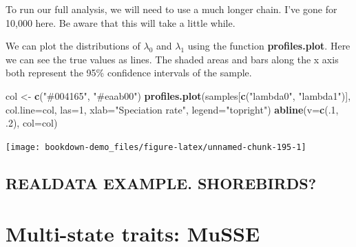 \documentclass[
]{book}
\newenvironment{Shaded}{\begin{snugshade}}{\end{snugshade}}
\newcommand{\DataTypeTok}[1]{\textcolor[rgb]{0.13,0.29,0.53}{#1}}
\newcommand{\DecValTok}[1]{\textcolor[rgb]{0.00,0.00,0.81}{#1}}
\newcommand{\FloatTok}[1]{\textcolor[rgb]{0.00,0.00,0.81}{#1}}
\newcommand{\KeywordTok}[1]{\textcolor[rgb]{0.13,0.29,0.53}{\textbf{#1}}}
\newcommand{\NormalTok}[1]{#1}
\newcommand{\OperatorTok}[1]{\textcolor[rgb]{0.81,0.36,0.00}{\textbf{#1}}}
\newcommand{\StringTok}[1]{\textcolor[rgb]{0.31,0.60,0.02}{#1}}
\begin{document}
To run our full analysis, we will need to use a much longer chain. I've gone for 10,000 here. Be aware that this will take a little while.

\begin{Shaded}
\end{Shaded}

We can plot the distributions of \(\lambda_{0}\) and \(\lambda_{1}\) using the function \textbf{profiles.plot}. Here we can see the true values as lines. The shaded areas and bars along the x axis both represent the 95\% confidence intervals of the sample.

\begin{Shaded}
\begin{Highlighting}[]
\NormalTok{col \textless{}{-}}\StringTok{ }\KeywordTok{c}\NormalTok{(}\StringTok{"\#004165"}\NormalTok{, }\StringTok{"\#eaab00"}\NormalTok{)}
\KeywordTok{profiles.plot}\NormalTok{(samples[}\KeywordTok{c}\NormalTok{(}\StringTok{"lambda0"}\NormalTok{, }\StringTok{"lambda1"}\NormalTok{)], }\DataTypeTok{col.line=}\NormalTok{col, }\DataTypeTok{las=}\DecValTok{1}\NormalTok{,}
              \DataTypeTok{xlab=}\StringTok{"Speciation rate"}\NormalTok{, }\DataTypeTok{legend=}\StringTok{"topright"}\NormalTok{)}
\KeywordTok{abline}\NormalTok{(}\DataTypeTok{v=}\KeywordTok{c}\NormalTok{(.}\DecValTok{1}\NormalTok{, }\FloatTok{.2}\NormalTok{), }\DataTypeTok{col=}\NormalTok{col)}
\end{Highlighting}
\end{Shaded}

\begin{center}\texttt{[image: bookdown-demo\_files/figure-latex/unnamed-chunk-195-1]} \end{center}

\hypertarget{realdata-example.-shorebirds}{%
\subsection{REALDATA EXAMPLE. SHOREBIRDS?}\label{realdata-example.-shorebirds}}

\hypertarget{multi-state-traits-musse}{%
\section{Multi-state traits: MuSSE}\label{multi-state-traits-musse}}
\end{document}
